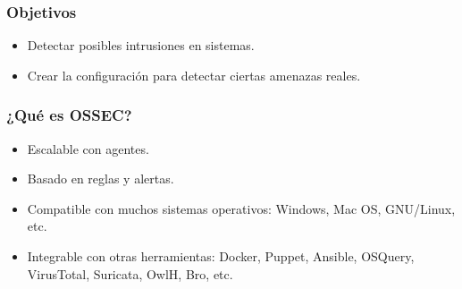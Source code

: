 \documentclass[a4paper,10pt]{beamer}
\begin{document}
\begin{frame}[fragile]
	\frametitle{Objetivos}

	\begin{itemize}
		\item Detectar posibles intrusiones en sistemas. %
		\item Crear la configuración para detectar ciertas amenazas reales. %
	\end{itemize}
\end{frame}

\begin{frame}[fragile]
	\frametitle{¿Qué es OSSEC?}

	\begin{itemize}
		\item Escalable con agentes. %
		\item Basado en reglas y alertas. %
		\item Compatible con muchos sistemas operativos: Windows, Mac OS, GNU/Linux, etc.
		\item Integrable con otras herramientas: Docker, Puppet, Ansible, OSQuery, VirusTotal, Suricata, OwlH, Bro, etc.
	\end{itemize}
\end{frame}
\end{document}
